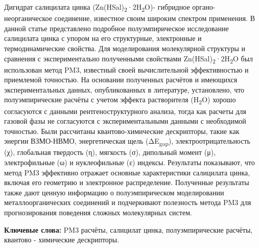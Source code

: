 Дигидрат салицилата цинка
(Zn(HSal)\textsubscript{2}·2H\textsubscript{2}O)- гибридное
органо-неорганическое соединение, известное своим широким спектром
применения. В данной статье представлено подробное полуэмпирическое
исследование салицилата цинка с упором на его структурные, электронные и
термодинамические свойства. Для моделирования молекулярной структуры и
сравнения с экспериментально полученными свойствами
Zn(HSal)\textsubscript{2}·2H\textsubscript{2}O был использован метод
PM3, известный своей вычислительной эффективностью и приемлемой
точностью. На основании полученных расчётов и имеющихся
экспериментальных данных, опубликованных в литературе, установлено, что
полуэмпирические расчёты с учетом эффекта растворителя
(H\textsubscript{2}O) хорошо согласуются с данными рентгеноструктурного
анализа, тогда как расчеты для газовой фазы не согласуются с
экспериментальными данными с необходимой точностью. Были рассчитаны
квантово-химические дескрипторы, такие как энергии ВЗМО-НВМО,
энергетическая щель (ΔE\textsubscript{gap}), электроотрицательность (χ),
глобальная твердость (η), мягкость (σ), дипольный момент (μ),
электрофильные (ω) и нуклеофильные (ε) индексы. Результаты показывают,
что метод PM3 эффективно отражает основные характеристики салицилата
цинка, включая его геометрию и электронное распределение. Полученные
результаты также дают ценную информацию о полуэмпирическом моделировании
металлоорганических соединений и подчеркивают полезность метода PM3 для
прогнозирования поведения сложных молекулярных систем.

{\bfseries Ключевые слова:} PM3 расчёты, салицилат цинка, полуэмпирические
расчёты, квантово - химические дескрипторы.

